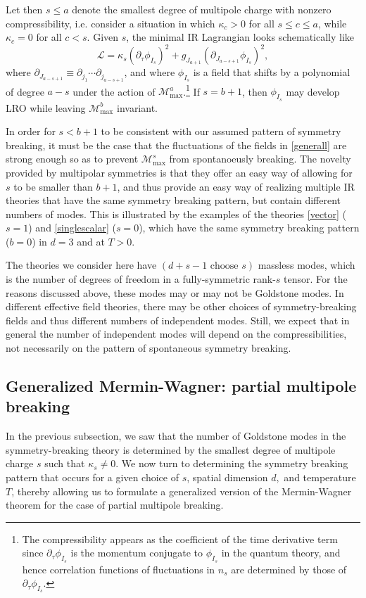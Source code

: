 \documentclass[prb,aps,twocolumn, amsfonts,amsmath,amssymb,nofootinbib,superscriptaddress]{revtex4-2}
\renewcommand{\max}{\text{max}}
\newcommand{\mmax}[1]{\mathcal{M}^{#1}_\max}
\newcommand\be            {\begin{equation}}
\newcommand\ee            {\end{equation}}
\newcommand{\p}{\partial}
\begin{document}
Let then $s\leq a$ denote the smallest degree of multipole charge with nonzero compressibility, i.e. consider a situation in which $\kappa_c>0$ for all $s\leq c\leq a$, while $\kappa_c=0$ for all $c<s$. 
Given $s$, the minimal IR Lagrangian looks schematically like 
\be \label{generall} \mathcal{L} = \kappa_s (\partial_\tau \phi_{I_s})^2 + g_{J_{a+1}}(\partial_{J_{a-s+1}}\phi_{I_s})^2,\ee where 
$\p_{J_{a-s+1}} \equiv \p_{j_1} \cdots \p_{j_{a-s+1}}$, and where $\phi_{I_s}$ is a field that shifts by a polynomial of degree $a-s$ under the action of $\mmax a$.\footnote{The compressibility appears as the coefficient of the time derivative term since $\p_\tau \phi_{I_s}$ is the momentum conjugate to $\phi_{I_s}$ in the quantum theory, and hence correlation functions of fluctuations in $n_s$ are determined by those of $\p_\tau \phi_{I_s}$.}  If $s=b+1$, then $\phi_{I_s}$ may develop LRO while leaving $\mmax{b}$ invariant.

In order for $s< b+1$ to be consistent with our assumed pattern of symmetry breaking, it must be the case that the fluctuations of the fields in \eqref{generall} are strong enough so as to prevent $\mmax {s}$ from spontanoeusly breaking. The novelty provided by multipolar symmetries is that they offer an easy way of allowing for $s$ to be smaller than $b+1$, and thus provide an easy way of realizing multiple IR theories that have the same symmetry breaking pattern, but contain different numbers of modes. This is illustrated by the examples of the theories \eqref{vector} ($s=1$) and \eqref{singlescalar} ($s=0$), which have the same symmetry breaking pattern ($b=0$) in $d=3$ and at $T>0$. 

The theories we consider here have $(d+s-1 \text{ choose } s)$ massless modes, which is the number of degrees of freedom in a fully-symmetric rank-$s$ tensor. For the reasons discussed above, these modes may or may not be Goldstone modes. In different effective field theories, there may be other choices of symmetry-breaking fields and thus different numbers of independent modes. Still, we expect that in general the number of independent modes will depend on the compressibilities, not necessarily on the pattern of spontaneous symmetry breaking.

\subsection{Generalized Mermin-Wagner: partial multipole breaking} \label{sub:partial}

In the previous subsection, we saw that the number of Goldstone modes in the symmetry-breaking theory is determined by the smallest degree of multipole charge $s$ such that $\kappa_s\neq0$. We now turn to determining the symmetry breaking pattern that occurs for a given choice of $s$, spatial dimension $d,$ and temperature $T$, thereby allowing us to formulate a generalized version of the Mermin-Wagner theorem for the case of partial multipole breaking. 
\end{document}
